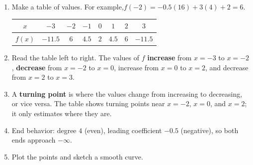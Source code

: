 \begin{minipage}[t]{0.55\textwidth}
\vspace{0pt}
\begin{enumerate}[label=\textbf{\arabic*.}, itemsep=2pt]
\item Make a table of values. For example,\newline $f(-2)=-0.5(16)+3(4)+2=6$.

\vspace{2pt}
{\small
\begin{tabular}{|c|c|c|c|c|c|c|c|}
\hline
$x$ & $-3$ & $-2$ & $-1$ & $0$ & $1$ & $2$ & $3$ \\ \hline
$f(x)$ & $-11.5$ & $6$ & $4.5$ & $2$ & $4.5$ & $6$ & $-11.5$ \\ \hline
\end{tabular}}
\item Read the table left to right. The values of $f$ \textbf{increase} from $x=-3$ to $x=-2$, \textbf{decrease} from $x=-2$ to $x=0$, increase from $x=0$ to $x=2$, and decrease from $x=2$ to $x=3$.
\item A \textbf{turning point} is where the values change from increasing to decreasing, or vice versa. The table shows turning points near $x=-2$, $x=0$, and $x=2$; it only estimates where they are.
\item End behavior: degree $4$ (even), leading coefficient $-0.5$ (negative), so both ends approach $-\infty$.
\item Plot the points and sketch a smooth curve.
\end{enumerate}
\end{minipage}\hfill
